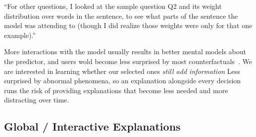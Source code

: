 ``For other questions, I looked at the sample question Q2 and its weight distribution over words in the sentence, to see what parts of the sentence the model was attending to (though I did realize those weights were only for that one example).''

More interactions with the model usually results in better mental models about the predictor, and users wold become less surprised by most counterfactuals~\cite{miller}.
We are interested in learning whether our selected ones \emph{still add information}
Less surprised by abnormal phenomena, so an explanation alongside every decision runs the risk of providing explanations that become less needed and more distracting over time.

\subsection{Global / Interactive Explanations}
\label{subsec:global_exp}

